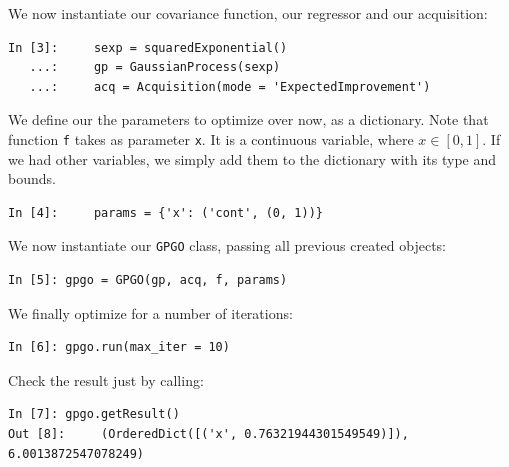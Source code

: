 \documentclass[10pt,a4paper,twoside]{book}
\begin{document}
We now instantiate our covariance function, our regressor and our acquisition:

\begin{verbatim}
In [3]:     sexp = squaredExponential()
   ...:     gp = GaussianProcess(sexp)
   ...:     acq = Acquisition(mode = 'ExpectedImprovement')
\end{verbatim}

We define our the parameters to optimize over now, as a dictionary. Note that function \texttt{f} takes as parameter \texttt{x}. It is a continuous variable, where $x\in \left[0, 1\right]$. If we had other variables, we simply add them to the dictionary with its type and bounds.

\begin{verbatim}
In [4]:     params = {'x': ('cont', (0, 1))}
\end{verbatim}

We now instantiate our \texttt{GPGO} class, passing all previous created objects:

\begin{verbatim}
In [5]:	gpgo = GPGO(gp, acq, f, params)
\end{verbatim}

We finally optimize for a number of iterations:

\begin{verbatim}
In [6]: gpgo.run(max_iter = 10)               
\end{verbatim}

Check the result just by calling:

\begin{verbatim}
In [7]: gpgo.getResult()
Out [8]:	 (OrderedDict([('x', 0.76321944301549549)]), 6.0013872547078249)
\end{verbatim}
\end{document}
